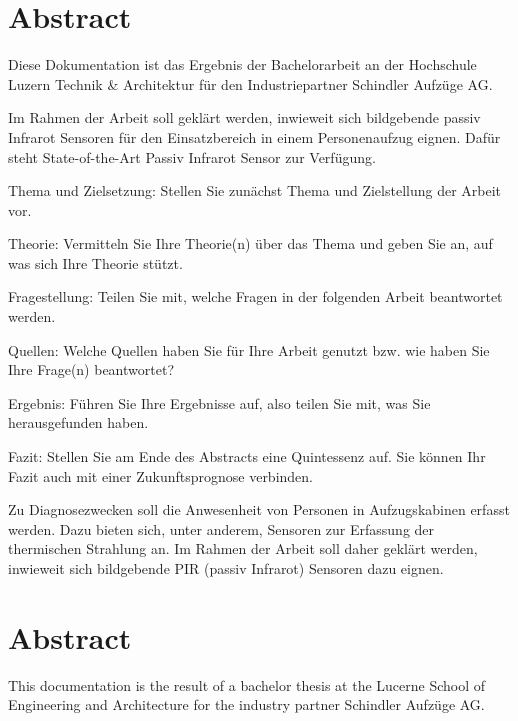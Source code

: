 \chapter*{Abstract}
\label{chap:abstract_german}
Diese Dokumentation ist das Ergebnis der Bachelorarbeit an der Hochschule Luzern Technik \& Architektur für den Industriepartner Schindler Aufzüge AG. 


Im Rahmen der Arbeit soll geklärt werden, inwieweit sich bildgebende passiv Infrarot Sensoren für den Einsatzbereich in einem Personenaufzug eignen. Dafür steht State-of-the-Art Passiv Infrarot Sensor zur Verfügung. 


Thema und Zielsetzung: Stellen Sie zunächst Thema und Zielstellung der Arbeit vor.

Theorie: Vermitteln Sie Ihre Theorie(n) über das Thema und geben Sie an, auf was sich Ihre Theorie stützt.

Fragestellung: Teilen Sie mit, welche Fragen in der folgenden Arbeit beantwortet werden.

Quellen: Welche Quellen haben Sie für Ihre Arbeit genutzt bzw. wie haben Sie Ihre Frage(n) beantwortet?

Ergebnis: Führen Sie Ihre Ergebnisse auf, also teilen Sie mit, was Sie herausgefunden haben.

Fazit: Stellen Sie am Ende des Abstracts eine Quintessenz auf. Sie können Ihr Fazit auch mit einer Zukunftsprognose verbinden.


Zu Diagnosezwecken soll die Anwesenheit von Personen in Aufzugskabinen erfasst werden. Dazu bieten sich, unter anderem, Sensoren zur Erfassung der thermischen Strahlung an. Im Rahmen der Arbeit soll daher geklärt werden, inwieweit sich bildgebende PIR (passiv Infrarot) Sensoren dazu eignen. 


\chapter*{Abstract}
\label{chap:abstract_english}

This documentation is the result of a bachelor thesis at the Lucerne School
of Engineering and Architecture for the industry partner Schindler Aufzüge AG.

